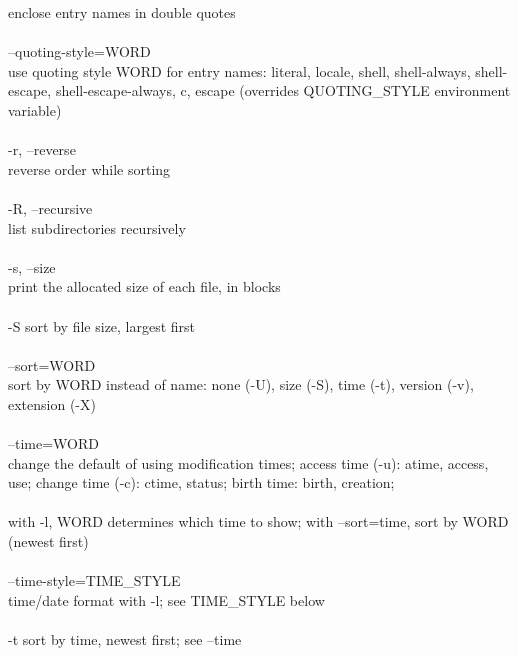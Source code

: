 \documentclass{article}
\begin{document}
\tabto{2cm}              enclose entry names in double quotes \\
\\
\tabto{1cm}       --quoting-style=WORD \\
\tabto{2cm}              use  quoting style WORD for entry names: literal, locale, shell,
\tabto{2cm}              shell-always,  shell-escape,  shell-escape-always,   c,   escape
\tabto{2cm}              (overrides QUOTING_STYLE environment variable) \\
\\
\tabto{1cm}       -r, --reverse \\
\tabto{2cm}              reverse order while sorting \\
\\
\tabto{1cm}       -R, --recursive \\
\tabto{2cm}              list subdirectories recursively \\
\\
\tabto{1cm}       -s, --size \\
\tabto{2cm}              print the allocated size of each file, in blocks \\
\\
\tabto{1cm}       -S     sort by file size, largest first \\
\\
\tabto{1cm}       --sort=WORD \\
\tabto{2cm}              sort  by  WORD instead of name: none (-U), size (-S), time (-t),
\tabto{2cm}              version (-v), extension (-X) \\
\\
\tabto{1cm}       --time=WORD \\
\tabto{2cm}              change the default of  using  modification  times;  access  time
\tabto{2cm}              (-u): atime, access, use; change time (-c): ctime, status; birth
\tabto{2cm}              time: birth, creation; \\
\\
\tabto{2cm}             with -l, WORD determines which time to show;  with  --sort=time,
\tabto{2cm}              sort by WORD (newest first) \\
\\
\tabto{1cm}       --time-style=TIME_STYLE \\
\tabto{2cm}              time/date format with -l; see TIME_STYLE below \\
\\
\tabto{1cm}       -t     sort by time, newest first; see --time \\
\end{document}
